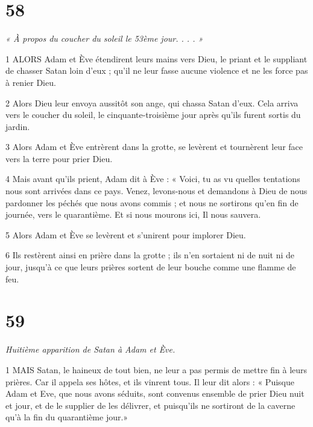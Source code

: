 \chapter{58}

\par \textit{« À propos du coucher du soleil le 53ème jour. . . . »}

\par 1 ALORS Adam et Ève étendirent leurs mains vers Dieu, le priant et le suppliant de chasser Satan loin d'eux ; qu'il ne leur fasse aucune violence et ne les force pas à renier Dieu.

\par 2 Alors Dieu leur envoya aussitôt son ange, qui chassa Satan d'eux. Cela arriva vers le coucher du soleil, le cinquante-troisième jour après qu'ils furent sortis du jardin.

\par 3 Alors Adam et Ève entrèrent dans la grotte, se levèrent et tournèrent leur face vers la terre pour prier Dieu.

\par 4 Mais avant qu'ils prient, Adam dit à Ève : « Voici, tu as vu quelles tentations nous sont arrivées dans ce pays. Venez, levons-nous et demandons à Dieu de nous pardonner les péchés que nous avons commis ; et nous ne sortirons qu'en fin de journée, vers le quarantième. Et si nous mourons ici, Il nous sauvera.

\par 5 Alors Adam et Ève se levèrent et s'unirent pour implorer Dieu.

\par 6 Ils restèrent ainsi en prière dans la grotte ; ils n'en sortaient ni de nuit ni de jour, jusqu'à ce que leurs prières sortent de leur bouche comme une flamme de feu.

\chapter{59}

\par \textit{Huitième apparition de Satan à Adam et Ève.}

\par 1 MAIS Satan, le haineux de tout bien, ne leur a pas permis de mettre fin à leurs prières. Car il appela ses hôtes, et ils vinrent tous. Il leur dit alors : « Puisque Adam et Eve, que nous avons séduits, sont convenus ensemble de prier Dieu nuit et jour, et de le supplier de les délivrer, et puisqu'ils ne sortiront de la caverne qu'à la fin du quarantième jour.»

